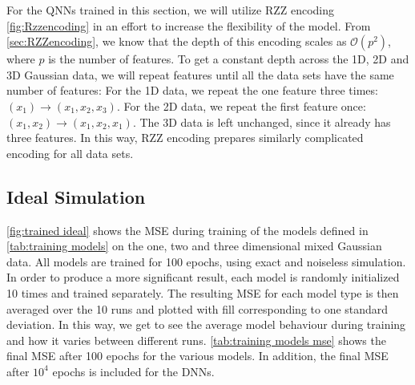 For the QNNs trained in this section, we will utilize RZZ encoding \autoref{fig:Rzzencoding} in an effort to increase the flexibility of the model. From \autoref{sec:RZZencoding}, we know that the depth of this encoding scales as $\mathcal{O}(p^2)$, where $p$ is the number of features. To get a constant depth across the 1D, 2D and 3D Gaussian data, we will repeat features until all the data sets have the same number of features: For the 1D data, we repeat the one feature three times: $(x_1) \rightarrow (x_1, x_2, x_3)$. For the 2D data, we repeat the first feature once: $(x_1, x_2) \rightarrow (x_1, x_2, x_1)$. The 3D data is left unchanged, since it already has three features. In this way, RZZ encoding prepares similarly complicated encoding for all data sets. 


\subsection{Ideal Simulation}\label{sec:Ideal Simulation}
\autoref{fig:trained ideal} shows the MSE during training of the models defined in \autoref{tab:training models} on the one, two and three dimensional mixed Gaussian data. All models are trained for 100 epochs, using exact and noiseless simulation. In order to produce a more significant result, each model is randomly initialized 10 times and trained separately. The resulting MSE for each model type is then averaged over the 10 runs and plotted with fill corresponding to one standard deviation. In this way, we get to see the average model behaviour during training and how it varies between different runs. \autoref{tab:training models mse} shows the final MSE after 100 epochs for the various models. In addition, the final MSE after $10^4$ epochs is included for the DNNs.   

